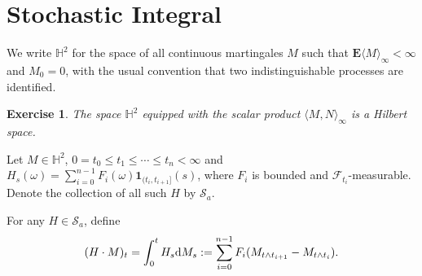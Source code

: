 \documentclass[twoside, 12pt]{book}
\numberwithin{equation}{chapter}
\newtheorem{exercise}{Exercise}[section]
\def\cF{{\mathcal F}}
\def\cS{{\mathcal S}}
\def\mH{{\mathbb H}}
\def\bE{{\mathbf E}}
\def\<{\langle}
\def\>{\rangle}
\def\leq{\leqslant}
\def\1{{\mathbf{1}}}
\def\d{\text{\rm{d}}}
\begin{document}
	\section{Stochastic Integral}
	
	We write $\mH^2$ for the space of all continuous martingales $M$ such that $\bE \<M\>_\infty<\infty$ and $M_0=0$, with the usual convention that two indistinguishable processes are identified. 
	\begin{exercise}
		The space $\mH^2$ equipped with the scalar product $\<M, N\>_\infty$ is a Hilbert space.
	\end{exercise}
	
	Let $M\in \mH^2$, $0=t_0\leq t_1\leq \cdots \leq t_{n}<\infty$ and $H_s(\omega) = \sum_{i=0}^{n-1} F_i(\omega)\1_{(t_{i},t_{i+1}]}(s)$, where $F_i$ is bounded and $\cF_{t_i}$-measurable. Denote the collection of all such $H$ by $\cS_{a}$. 
	 
	For any $H\in \cS_{a}$, define 
	\[
	    (H\cdot M)_t=\int_0^t H_s \d M_s:= \sum_{i=0}^{n-1} F_i (M_{t\wedge t_{i+1}}-M_{t\wedge t_{i}}). 
	\]
   
\end{document}
